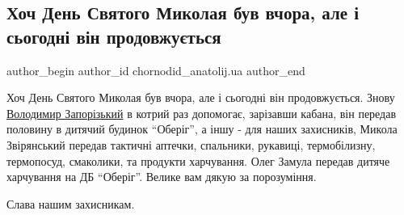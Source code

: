  
 
 
 
 
 
\subsection{Хоч День Святого Миколая був вчора, але і сьогодні він продовжується}
\label{sec:20_12_2022.fb.chornodid_anatolij.ua.1.mykolaj}
 
\ifcmt
 author_begin
   author_id chornodid_anatolij.ua
 author_end
\fi

Хоч День Святого Миколая був вчора, але і сьогодні він продовжується. Знову
\href{https://www.facebook.com/profile.php?id=100084981979191}{Володимир
Запорізький} в котрий раз допомогає, зарізавши кабана, він передав половину в
дитячий будинок \enquote{Оберіг}, а іншу - для наших захисників, Микола
Звірянський передав тактичні аптечки, спальники, рукавиці, термобілизну,
термопосуд, смаколики, та продукти харчування.  Олег Замула передав дитяче
харчування на ДБ \enquote{Оберіг}.  Велике вам дякую за порозуміння.

Слава нашим захисникам.
